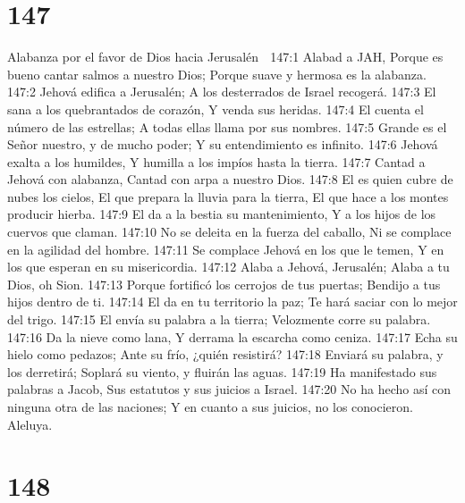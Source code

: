 \chapter{147}

Alabanza por el favor de Dios hacia Jerusalén 

147:1 Alabad a JAH, 
Porque es bueno cantar salmos a nuestro Dios; 
Porque suave y hermosa es la alabanza. 
147:2 Jehová edifica a Jerusalén; 
A los desterrados de Israel recogerá. 
147:3 El sana a los quebrantados de corazón, 
Y venda sus heridas. 
147:4 El cuenta el número de las estrellas; 
A todas ellas llama por sus nombres. 
147:5 Grande es el Señor nuestro, y de mucho poder; 
Y su entendimiento es infinito. 
147:6 Jehová exalta a los humildes, 
Y humilla a los impíos hasta la tierra. 
147:7 Cantad a Jehová con alabanza, 
Cantad con arpa a nuestro Dios. 
147:8 El es quien cubre de nubes los cielos, 
El que prepara la lluvia para la tierra, 
El que hace a los montes producir hierba. 
147:9 El da a la bestia su mantenimiento, 
Y a los hijos de los cuervos que claman. 
147:10 No se deleita en la fuerza del caballo, 
Ni se complace en la agilidad del hombre. 
147:11 Se complace Jehová en los que le temen, 
Y en los que esperan en su misericordia. 
147:12 Alaba a Jehová, Jerusalén; 
Alaba a tu Dios, oh Sion. 
147:13 Porque fortificó los cerrojos de tus puertas; 
Bendijo a tus hijos dentro de ti. 
147:14 El da en tu territorio la paz; 
Te hará saciar con lo mejor del trigo. 
147:15 El envía su palabra a la tierra; 
Velozmente corre su palabra. 
147:16 Da la nieve como lana, 
Y derrama la escarcha como ceniza. 
147:17 Echa su hielo como pedazos; 
Ante su frío, ¿quién resistirá? 
147:18 Enviará su palabra, y los derretirá; 
Soplará su viento, y fluirán las aguas. 
147:19 Ha manifestado sus palabras a Jacob, 
Sus estatutos y sus juicios a Israel. 
147:20 No ha hecho así con ninguna otra de las naciones; 
Y en cuanto a sus juicios, no los conocieron. 
Aleluya. 

\chapter{148}

